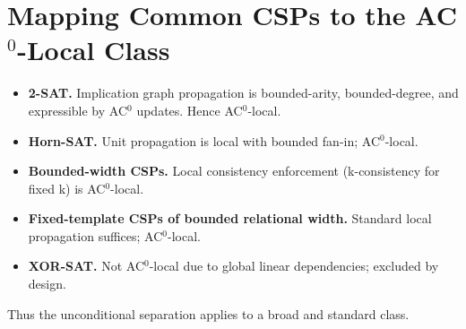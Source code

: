 \appendix
\section{Mapping Common CSPs to the AC$^0$-Local Class}

\begin{itemize}
\item \textbf{2-SAT.}
Implication graph propagation is bounded-arity, bounded-degree, and
expressible by AC$^0$ updates. Hence AC$^0$-local.

\item \textbf{Horn-SAT.}
Unit propagation is local with bounded fan-in; AC$^0$-local.

\item \textbf{Bounded-width CSPs.}
Local consistency enforcement (k-consistency for fixed k) is AC$^0$-local.

\item \textbf{Fixed-template CSPs of bounded relational width.}
Standard local propagation suffices; AC$^0$-local.

\item \textbf{XOR-SAT.}
Not AC$^0$-local due to global linear dependencies; excluded by design.
\end{itemize}

Thus the unconditional separation applies to a broad and standard class.

